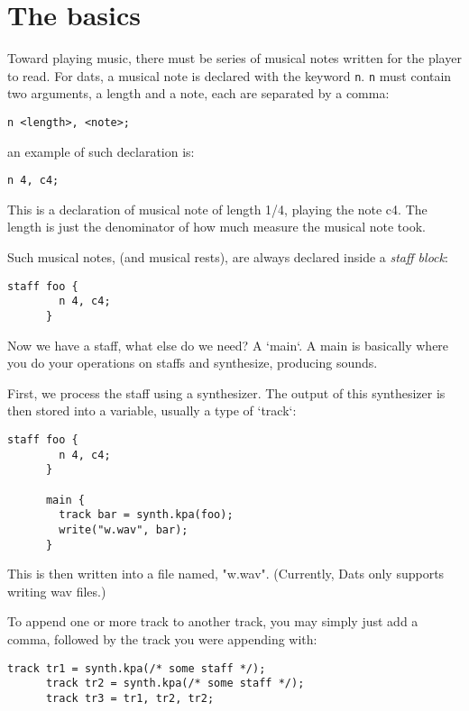 \section{The basics}

\np Toward playing music, there must be series of musical notes written for the player to read.
For dats, a musical note is declared with the keyword \verb+n+. \verb+n+ must contain two arguments,
a length and a note, each are separated by a comma:


\begin{Verbatim}[frame=single]
       n <length>, <note>;
\end{Verbatim}


\np an example of such declaration is:
\begin{Verbatim}[frame=single]
       n 4, c4;
\end{Verbatim}

This is a declaration of musical note of length 1/4, playing the note c4. The length
is just the denominator of how much measure the musical note took.

\np Such musical notes, (and musical rests), are always declared inside a \textit{staff block}:

\begin{Verbatim}[frame=single]
      staff foo {
        n 4, c4;
      }
\end{Verbatim}

\np Now we have a staff, what else do we need? A `main`. A main is basically
where you do your operations on staffs and synthesize, producing sounds.

\np First, we process the staff using a synthesizer. The output of this synthesizer
is then stored into a variable, usually a type of `track`:

\begin{Verbatim}[frame=single]
      staff foo {
        n 4, c4;
      }

      main {
        track bar = synth.kpa(foo);
        write("w.wav", bar);
      }
\end{Verbatim}

\np This is then written into a file named, "w.wav". (Currently, Dats only supports writing wav files.)

\np To append one or more track to another track, you may simply just add a comma, followed by the track
you were appending with:

\begin{Verbatim}[frame=single]
      track tr1 = synth.kpa(/* some staff */);
      track tr2 = synth.kpa(/* some staff */);
      track tr3 = tr1, tr2, tr2;
\end{Verbatim}
